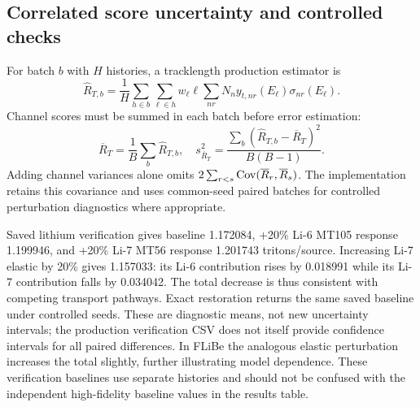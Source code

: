 \subsection{Correlated score uncertainty and controlled checks}
For batch $b$ with $H$ histories, a tracklength production estimator is
\begin{equation}
\widehat R_{T,b}=\frac{1}{H}\sum_{h\in b}\sum_{\ell\in h} w_\ell\ell\sum_{nr}N_n y_{t,nr}(E_\ell)\sigma_{nr}(E_\ell).
\end{equation}
Channel scores must be summed in each batch before error estimation:
\begin{equation}
\overline R_T=\frac{1}{B}\sum_b\widehat R_{T,b},\quad
s_{\overline R_T}^2=\frac{\sum_b(\widehat R_{T,b}-\overline R_T)^2}{B(B-1)}.
\label{eq:batch}
\end{equation}
Adding channel variances alone omits $2\sum_{r<s}\operatorname{Cov}(\overline R_r,\overline R_s)$. The implementation retains this covariance and uses common-seed paired batches for controlled perturbation diagnostics where appropriate.

Saved lithium verification gives baseline 1.172084, +20\% Li-6 MT105 response 1.199946, and +20\% Li-7 MT56 response 1.201743 tritons/source. Increasing Li-7 elastic by 20\% gives 1.157033: its Li-6 contribution rises by 0.018991 while its Li-7 contribution falls by 0.034042. The total decrease is thus consistent with competing transport pathways. Exact restoration returns the same saved baseline under controlled seeds. These are diagnostic means, not new uncertainty intervals; the production verification CSV does not itself provide confidence intervals for all paired differences. In FLiBe the analogous elastic perturbation increases the total slightly, further illustrating model dependence. These verification baselines use separate histories and should not be confused with the independent high-fidelity baseline values in the results table.
